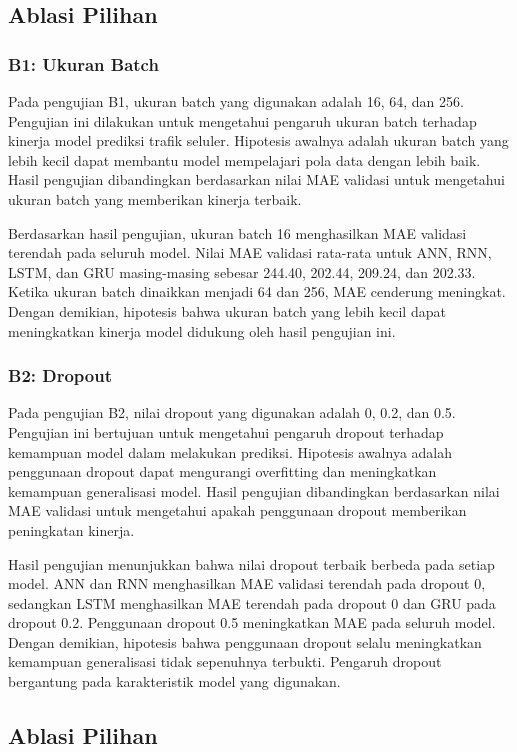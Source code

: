 \documentclass[conference,a4paper]{IEEEtran}
\begin{document}
\subsection{Ablasi Pilihan}
\subsubsection{B1: Ukuran Batch}
Pada pengujian B1, ukuran batch yang digunakan adalah 16, 64, dan 256. Pengujian ini dilakukan untuk mengetahui pengaruh ukuran batch terhadap kinerja model prediksi trafik seluler. Hipotesis awalnya adalah ukuran batch yang lebih kecil dapat membantu model mempelajari pola data dengan lebih baik. Hasil pengujian dibandingkan berdasarkan nilai MAE validasi untuk mengetahui ukuran batch yang memberikan kinerja terbaik.

Berdasarkan hasil pengujian, ukuran batch 16 menghasilkan MAE validasi terendah pada seluruh model. Nilai MAE validasi rata-rata untuk ANN, RNN, LSTM, dan GRU masing-masing sebesar 244.40, 202.44, 209.24, dan 202.33. Ketika ukuran batch dinaikkan menjadi 64 dan 256, MAE cenderung meningkat. Dengan demikian, hipotesis bahwa ukuran batch yang lebih kecil dapat meningkatkan kinerja model didukung oleh hasil pengujian ini.


\subsubsection{B2: Dropout}
Pada pengujian B2, nilai dropout yang digunakan adalah 0, 0.2, dan 0.5. Pengujian ini bertujuan untuk mengetahui pengaruh dropout terhadap kemampuan model dalam melakukan prediksi. Hipotesis awalnya adalah penggunaan dropout dapat mengurangi overfitting dan meningkatkan kemampuan generalisasi model. Hasil pengujian dibandingkan berdasarkan nilai MAE validasi untuk mengetahui apakah penggunaan dropout memberikan peningkatan kinerja.

Hasil pengujian menunjukkan bahwa nilai dropout terbaik berbeda pada setiap model. ANN dan RNN menghasilkan MAE validasi terendah pada dropout 0, sedangkan LSTM menghasilkan MAE terendah pada dropout 0 dan GRU pada dropout 0.2. Penggunaan dropout 0.5 meningkatkan MAE pada seluruh model. Dengan demikian, hipotesis bahwa penggunaan dropout selalu meningkatkan kemampuan generalisasi tidak sepenuhnya terbukti. Pengaruh dropout bergantung pada karakteristik model yang digunakan.
\subsection{Ablasi Pilihan}
\end{document}
